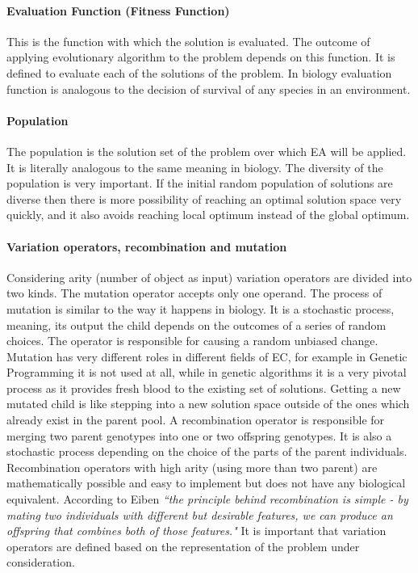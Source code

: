 \paragraph{Evaluation Function (Fitness Function)}
This is the function with which the solution is evaluated. The outcome of applying evolutionary algorithm to the problem depends on this function. It is defined to evaluate each of the solutions of the problem. In biology evaluation function is analogous to the decision of survival of any species in an environment. 

\paragraph{Population}
The population is the solution set of the problem over which EA will be applied. It is literally analogous to the same meaning in biology. The diversity of the population is very important. If the initial random population of solutions are diverse then there is more possibility of reaching an optimal solution space very quickly, and it also avoids reaching local optimum instead of the global optimum.

\paragraph{Variation operators, recombination and mutation}
Considering arity (number of object as input) variation operators are divided into two kinds. The mutation operator accepts only one operand. The process of mutation is similar to the way it happens in biology. It is a stochastic process, meaning, its output the child depends on the outcomes of a series of random choices. The operator is responsible for causing a random unbiased change. Mutation has very different roles in different fields of EC, for example in Genetic Programming it is not used at all, while in genetic algorithms it is a very pivotal process as it provides fresh blood to the existing set of solutions. Getting a new mutated child is like stepping into a new solution space outside of the ones which already exist in the parent pool. A recombination operator is responsible for merging two parent genotypes into one or two offspring genotypes. It is also a stochastic process depending on the choice of the parts of the parent individuals. Recombination operators with high arity (using more than two parent) are mathematically possible and easy to implement but does not have any biological equivalent. According to Eiben \cite{eiben2003} \textsl{``the principle behind recombination is simple - by mating two individuals with different but desirable features, we can produce an offspring that combines both of those features."} It is important that variation operators are defined based on the representation of the problem under consideration. 

